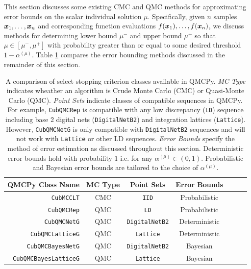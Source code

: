 \documentclass{article}[12pt]
\begin{document}
This section discusses some existing CMC and QMC methods for approximating error bounds on the scalar individual solution $\mu$. Specifically, given $n$ samples $\boldsymbol{x}_1,\dots,\boldsymbol{x}_n$ and corresponding function evaluations $f(\boldsymbol{x}_1),\dots,f(\boldsymbol{x}_n)$, we discuss methods for determining lower bound $\mu^-$ and upper bound $\mu^+$ so that $\mu \in [\mu^-,\mu^+]$ with probability greater than or equal to some desired threshold $1-\alpha^{(\mu)}$. Table \ref{table:qmcpy_sc} compares the error bounding methods discussed in the remainder of this section.

\begin{table}[H]
\begin{tabular}{r c c c c c c}
    QMCPy Class Name & MC Type & Point Sets & Error Bounds \\
    \hline
    \texttt{CubMCCLT} \cite{cubmcg} & CMC & \texttt{IID} & Probabilistic \\
    \texttt{CubQMCRep} \cite{mcbook} & QMC & \texttt{LD} & Probabilistic \\
    \texttt{CubQMCNetG} \cite{cubqmcsobol} & QMC & \texttt{DigitalNetB2} & Deterministic \\
    \texttt{CubQMCLatticeG} \cite{cubqmclattice} & QMC & \texttt{Lattice} & Deterministic \\
    \texttt{CubQMCBayesNetG} \cite{JagThesis19a} & QMC &  \texttt{DigitalNetB2} & Bayesian \\
    \texttt{CubQMCBayesLatticeG} \cite{cubqmcbayeslattice} & QMC & \texttt{Lattice} & Bayesian \\
    \hline
\end{tabular}
\caption{A comparison of select stopping criterion classes available in QMCPy. \emph{MC Type} indicates wheather an algorithm is Crude Monte Carlo (CMC) or Quasi-Monte Carlo (QMC). \emph{Point Sets} indicate classes of compatible sequences in QMCPy. For example, \texttt{CubQMCRep} is compatible with any low discrepancy (\texttt{LD}) sequence including base 2 digital nets (\texttt{DigitalNetB2}) and integration lattices (\texttt{Lattice}). However, \texttt{CubQMCNetG} is only compatible with \texttt{DigitalNetB2} sequences and will not work with \texttt{Lattice} or other LD sequences. \emph{Error Bounds} specify the method of error estimation as discussed throughout this section. Deterministic error bounds hold with probability $1$ i.e. for any $\alpha^{(\mu)} \in (0,1)$. Probabilistic and Bayesian error bounds are tailored to the choice of $\alpha^{(\mu)}$.}
\label{table:qmcpy_sc}
\end{table}
\end{document}
